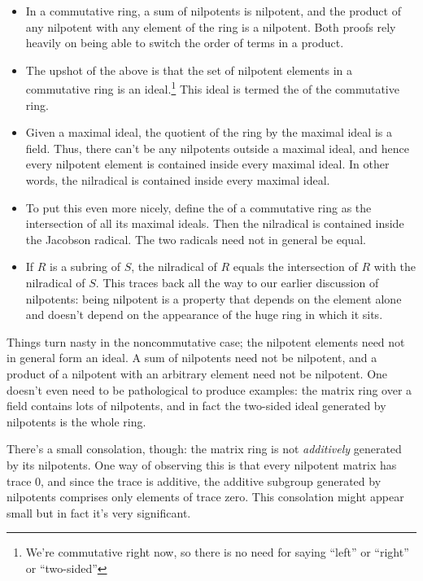 \documentclass[a4paper]{amsart}
\begin{document}
\begin{itemize}

\item In a commutative ring, a sum of nilpotents is nilpotent, and the
  product of any nilpotent with any element of the ring is a
  nilpotent. Both proofs rely heavily on being able to switch the
  order of terms in a product.

\item The upshot of the above is that the set of nilpotent elements in
  a commutative ring is an ideal.\footnote{We're commutative right
    now, so there is no need for saying ``left'' or ``right'' or
    ``two-sided''} This ideal is termed the  of
  the commutative ring.

\item Given a maximal ideal, the quotient of the ring by the maximal
  ideal is a field. Thus, there can't be any nilpotents outside a
  maximal ideal, and hence every nilpotent element is contained inside
  every maximal ideal. In other words, the nilradical is contained
  inside every maximal ideal.

\item To put this even more nicely, define the  of a commutative ring as the intersection of all its
  maximal ideals. Then the nilradical is contained inside the Jacobson
  radical. The two radicals need not in general be equal.

\item If $R$ is a subring of $S$, the nilradical of $R$ equals the
  intersection of $R$ with the nilradical of $S$. This traces back all
  the way to our earlier discussion of nilpotents: being nilpotent is
  a property that depends on the element alone and doesn't depend on
  the appearance of the huge ring in which it sits.

\end{itemize}

Things turn nasty in the noncommutative case; the nilpotent elements
need not in general form an ideal. A sum of nilpotents need not be
nilpotent, and a product of a nilpotent with an arbitrary element need
not be nilpotent. One doesn't even need to be pathological to produce
examples: the matrix ring over a field contains lots of nilpotents,
and in fact the two-sided ideal generated by nilpotents is the whole
ring.

There's a small consolation, though: the matrix ring is not {\em additively}
generated by its nilpotents. One way of observing this is that every
nilpotent matrix has trace $0$, and since the trace is additive, the
additive subgroup generated by nilpotents comprises only elements of
trace zero. This consolation might appear small but in fact it's very
significant.
\end{document}

